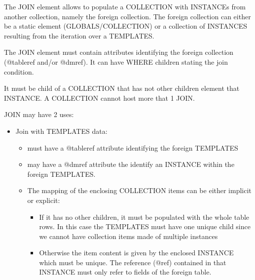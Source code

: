 The JOIN element allows to populate a COLLECTION with INSTANCEs from another collection, namely the foreign collection.
The foreign collection can either be a static element (GLOBALS/COLLECTION) or a collection of INSTANCES resulting from the iteration over a TEMPLATES.

The JOIN element must contain attributes identifying the foreign collection  (@tableref and/or @dmref). It can have WHERE children stating the join condition.

It must be child of a COLLECTION that has not other children element that INSTANCE. A COLLECTION cannot host more that 1 JOIN.

JOIN may have 2 uses:

\begin{itemize}

  \item Join with TEMPLATES data:
       \begin{itemize}
         \item must have a @tableref attribute identifying the foreign TEMPLATES
         \item may have a @dmref attribute the identify an INSTANCE within the foreign TEMPLATES.
         \item The mapping of the enclosing COLLECTION items can be either implicit or explicit:
         \begin{itemize}
             \item If it has no other children, it must be populated with the whole table rows. In this case the TEMPLATES must have one unique child 
                      since we cannot have collection items made of multiple instances
             \item Otherwise the item content is given by the enclosed INSTANCE which must be unique.
                     The reference (@ref) contained in that INSTANCE must only refer to fields of the foreign table.
         \end{itemize}
  \end{itemize}


\end{itemize}

